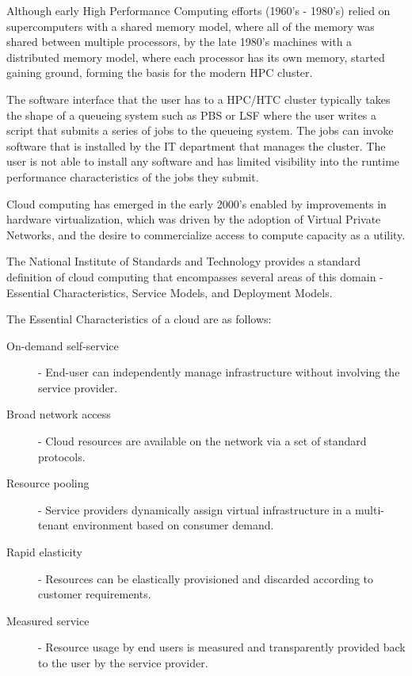 Although early High Performance Computing efforts (1960's - 1980's) relied on supercomputers with a shared memory model\autocite{russell1978cray}, where all of the memory was shared between multiple processors, by the late 1980's machines with a distributed memory model\autocite{nitzberg1991distributed}, where each processor has its own memory, started gaining ground, forming the basis for the modern HPC cluster.

The software interface that the user has to a HPC/HTC cluster typically takes the shape of a queueing system such as PBS\autocite{henderson1995job} or LSF\autocite{zhou1992lsf}  where the user writes a script that submits a series of jobs to the queueing system. The jobs can invoke software that is installed by the IT department that manages the cluster. The user is not able to install any software and has limited visibility into the runtime performance characteristics of the jobs they submit. 

Cloud computing has emerged in the early 2000's enabled by improvements in hardware virtualization, which was driven by the adoption of Virtual Private Networks, and the desire to commercialize access to compute capacity as a utility\autocite{buyya2009cloud}.

The National Institute of Standards and Technology provides a standard definition of cloud computing that encompasses several areas of this domain - Essential Characteristics, Service Models, and Deployment Models\autocite{mell2011nist}.

The Essential Characteristics of a cloud are as follows:

\begin{description}
\item [On-demand self-service] - End-user can independently manage infrastructure without involving the service provider.
\item [Broad network access] - Cloud resources are available on the network via a set of standard protocols.
\item [Resource pooling] - Service providers dynamically assign virtual infrastructure in a multi-tenant environment based on consumer demand.
\item [Rapid elasticity] - Resources can be elastically provisioned and discarded according to customer requirements.
\item [Measured service] - Resource usage by end users is measured and transparently provided back to the user by the service provider.
\end{description}

